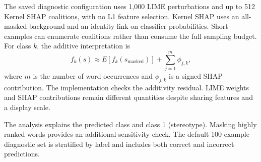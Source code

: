 The saved diagnostic configuration uses 1,000 LIME perturbations and up to 512 Kernel SHAP coalitions, with no L1 feature selection. Kernel SHAP uses an all-masked background and an identity link on classifier probabilities. Short examples can enumerate coalitions rather than consume the full sampling budget. For class $k$, the additive interpretation is
\begin{equation}
f_k(s)\approx E[f_k(s_{\mathrm{masked}})]+\sum_{j=1}^{m}\phi_{j,k},
\end{equation}
where $m$ is the number of word occurrences and $\phi_{j,k}$ is a signed SHAP contribution. The implementation checks the additivity residual. LIME weights and SHAP contributions remain different quantities despite sharing features and a display scale.

The analysis explains the predicted class and class 1 (stereotype). Masking highly ranked words provides an additional sensitivity check. The default 100-example diagnostic set is stratified by label and includes both correct and incorrect predictions.
